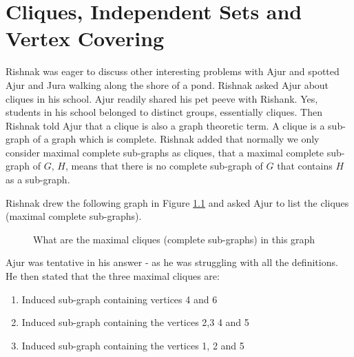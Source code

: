 \chapter{Cliques, Independent Sets and Vertex Covering }
Rishnak was eager to discuss other interesting problems with Ajur and  spotted Ajur and Jura walking along the shore of a pond. Rishnak asked Ajur about cliques in his school. Ajur readily shared his pet peeve with Rishank. Yes, students in his school belonged to distinct groups, essentially cliques. Then Rishnak told Ajur that a clique is also a graph theoretic term. A clique is a sub-graph of a graph which is complete. Rishnak added that normally we only consider maximal complete sub-graphs as cliques, that a maximal complete sub-graph of $G$, $H$, means that there is no complete sub-graph of $G$ that contains $H$ as a sub-graph.

Rishnak drew the following graph in Figure \ref{13g1} and asked Ajur to list the cliques (maximal complete sub-graphs).
\begin{figure}
\begin{center}
\caption{ What are the maximal cliques (complete sub-graphs) in this graph}\label{13g1}
\end{center}
\end{figure}

Ajur was tentative in his answer - as he was struggling with all the definitions. He then stated that the three maximal cliques are: 
\begin{enumerate}
    \item Induced sub-graph containing vertices 4 and 6
    \item Induced sub-graph containing the vertices 2,3 4 and 5
    \item Induced sub-graph containing the vertices 1, 2 and 5
\end{enumerate} 

